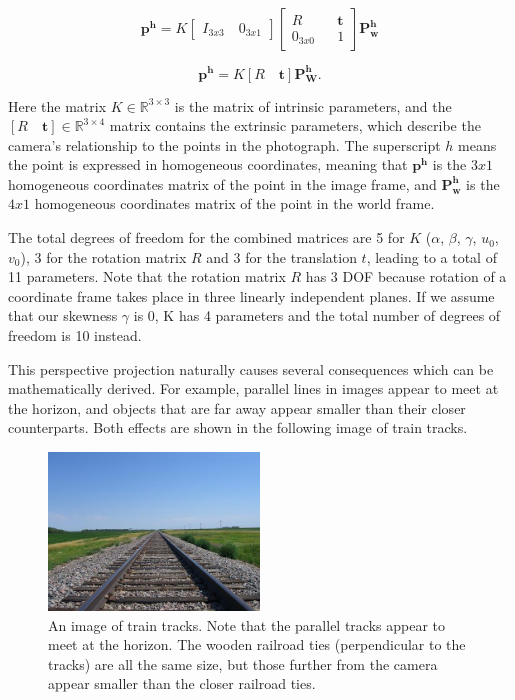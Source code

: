 \documentclass[]{article}
\begin{document}
	\begin{equation}
	\boldsymbol{p^h}
	=
	K \begin{bmatrix}
	I_{3x3} \quad 0_{3x1}
	\end{bmatrix}
	\begin{bmatrix}
	R && \boldsymbol{t} \\
	0_{3x0} && 1
	\end{bmatrix}
	\boldsymbol{P_w^h}
	\end{equation}
	
	\begin{equation}
	\boldsymbol{p^h} = K[R \quad \boldsymbol{t}] \boldsymbol{P_W^h}.
	\end{equation}
	
	Here the matrix $K \in \mathbb{R}^{3\times3}$ is the matrix of intrinsic parameters, and the $[R \quad \boldsymbol{t}] \in \mathbb{R}^{3\times4}$ matrix contains the extrinsic parameters, which describe the camera's relationship to the points in the photograph. The superscript $h$ means the point is expressed in homogeneous coordinates, meaning that $\boldsymbol{p^h}$ is the $3x1$ homogeneous coordinates matrix of the point in the image frame, and $\boldsymbol{P_w^h}$ is the $4x1$ homogeneous coordinates matrix of the point in the world frame.
	
	The total degrees of freedom for the combined matrices are 5 for $K$ ($\alpha$, $\beta$, $\gamma$, $u_0$, $v_0$), 3 for the rotation matrix $R$ and 3 for the translation $t$, leading to a total of 11 parameters. Note that the rotation matrix $R$ has 3 DOF because rotation of a coordinate frame takes place in three linearly independent planes. If we assume that our skewness $\gamma$ is 0, K has 4 parameters and the total number of degrees of freedom is 10 instead.
	
	This perspective projection naturally causes several consequences which can be mathematically derived. For example, parallel lines in images appear to meet at the horizon, and objects that are far away appear smaller than their closer counterparts. Both effects are shown in the following image of train tracks.
	
	\begin{figure}[H]
		\includegraphics[width=0.5\textwidth]{traintracks.jpg}
		\centering
		\caption{An image of train tracks. Note that the parallel tracks appear to meet at the horizon. The wooden railroad ties (perpendicular to the tracks) are all the same size, but those further from the camera appear smaller than the closer railroad ties. }
		\label{fig:train_tracks}
	\end{figure}
	
\end{document}
